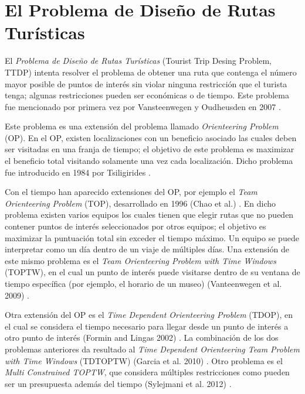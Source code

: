 \section[El Problema de Diseño de Rutas Turísticas]{El Problema de Diseño de Rutas Turísticas}
El \textit{Problema de Diseño de Rutas Turísticas} (Tourist Trip Desing Problem, TTDP) intenta resolver el problema de obtener una ruta que contenga el número mayor posible de puntos de interés sin violar ninguna restricción que el turista tenga; algunas restricciones pueden ser económicas o de tiempo. Este problema fue mencionado por primera vez por Vansteenwegen y Oudheusden en 2007 \cite{first_article_TTDP}.\newline

Este problema es una extensión del problema llamado \textit{Orienteering Problem} (OP). En el OP, existen localizaciones con un beneficio asociado las cuales deben ser visitadas en una franja de tiempo; el objetivo de este problema es maximizar el beneficio total visitando solamente una vez cada localización. Dicho problema fue introducido en 1984 por Tsiligirides \cite{first_article_OP}.\newline

Con el tiempo han aparecido extensiones del OP, por ejemplo el \textit{Team Orienteering Problem} (TOP), desarrollado en 1996 (Chao et al.) \cite{Chao}. En dicho problema existen varios equipos los cuales tienen que elegir rutas que no pueden contener puntos de interés seleccionados por otros equipos; el objetivo es maximizar la puntuación total sin exceder el tiempo máximo. Un equipo se puede interpretar como un día dentro de un viaje de múltiples días. Una extensión de este mismo problema es el \textit{Team Orienteering Problem with Time Windows} (TOPTW), en el cual un punto de interés puede visitarse  dentro de su ventana de tiempo específica (por ejemplo, el horario de un museo) (Vanteenwegen et al. 2009) \cite{TOPTW}.\newline

Otra extensión del OP es el \textit{Time Dependent Orienteering Problem} (TDOP), en el cual se considera el tiempo necesario para llegar desde un punto de interés a otro punto de interés (Formin and Lingas 2002) \cite{TDOP}. La combinación de los dos problemas anteriores da resultado al \textit{Time Dependent Orienteering Team Problem with Time Windows} (TDTOPTW) (Garcia et al. 2010) \cite{TDTOPTW}. Otro problema es el \textit{Multi Constrained TOPTW}, que considera múltiples restricciones como pueden ser un presupuesta además del tiempo (Sylejmani et al. 2012) \cite{multiconstrained_toptw}.\newline

